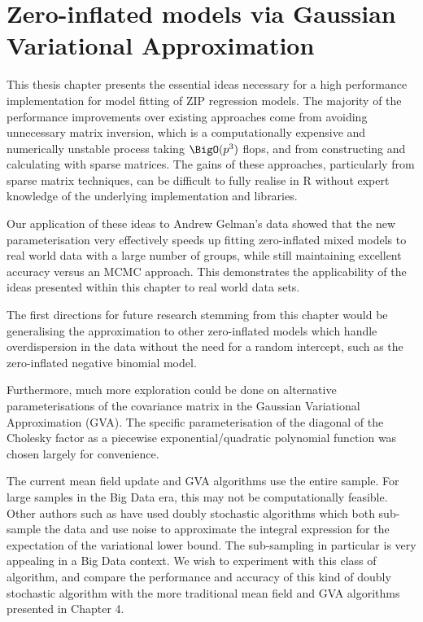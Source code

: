 \section{Zero-inflated models via Gaussian Variational Approximation }


This thesis chapter presents the essential ideas necessary for a high performance
implementation for model fitting of ZIP regression models.
The majority of the performance improvements over existing approaches come from
avoiding unnecessary matrix inversion, which is a computationally expensive
and numerically unstable process taking $\BigO(p^3)$ flops, and  from
constructing and calculating with sparse matrices. The gains of these
approaches, particularly from sparse  matrix techniques, can be difficult to
fully realise in R without expert knowledge of the underlying implementation
and libraries.

Our application of these ideas to Andrew Gelman's data showed that the new
parameterisation very effectively speeds up fitting zero-inflated mixed models
to real world data with a large number of groups, while still maintaining
excellent accuracy versus an MCMC approach. This demonstrates the applicability
of the ideas presented within this chapter to real world data sets.


The first directions for future research stemming from this chapter would be
generalising the approximation to other zero-inflated models which handle
overdispersion in the data without the need for a random intercept, such as the
zero-inflated negative binomial model.

Furthermore, much more exploration could be done on alternative
parameterisations of the covariance matrix in the Gaussian Variational
Approximation (GVA). The specific parameterisation of the diagonal of the Cholesky
factor as a piecewise exponential/quadratic polynomial function was chosen
largely for convenience.

The current mean field update and GVA algorithms
use the entire sample. For large samples in the Big Data era, this may not be
computationally feasible. Other authors such as \cite{Tan2018} have used doubly
stochastic algorithms which both sub-sample the data and use noise to
approximate the integral expression for the expectation of the variational
lower bound. The sub-sampling in particular is very appealing in a Big Data
context. We wish to experiment with this class of algorithm, and compare the
performance and accuracy of this kind of doubly stochastic algorithm with the
more traditional mean field and GVA algorithms presented in
Chapter 4.
